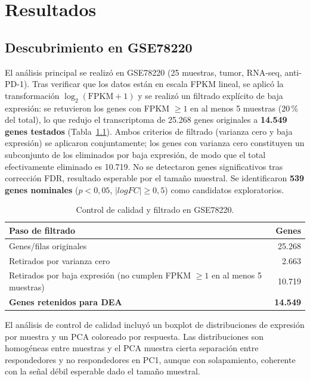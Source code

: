 \chapter{Resultados}

\section{Descubrimiento en GSE78220}

El análisis principal se realizó en GSE78220 (25 muestras, tumor, RNA-seq, anti-PD-1). Tras verificar que los datos están en escala FPKM lineal, se aplicó la transformación $\log_2(\text{FPKM}+1)$ y se realizó un filtrado explícito de baja expresión: se retuvieron los genes con FPKM $\geq 1$ en al menos 5 muestras (20\,\% del total), lo que redujo el transcriptoma de 25.268 genes originales a \textbf{14.549 genes testados} (Tabla~\ref{tab:qc_gse78220}). Ambos criterios de filtrado (varianza cero y baja expresión) se aplicaron conjuntamente; los genes con varianza cero constituyen un subconjunto de los eliminados por baja expresión, de modo que el total efectivamente eliminado es 10.719. No se detectaron genes significativos tras corrección FDR, resultado esperable por el tamaño muestral. Se identificaron \textbf{539 genes nominales} ($p < 0{,}05$, $|logFC| \geq 0{,}5$) como candidatos exploratorios.

\begin{table}[H]
\centering
\caption{Control de calidad y filtrado en GSE78220.}
\label{tab:qc_gse78220}
\begin{tabularx}{\textwidth}{l r}
\toprule
Paso de filtrado & Genes \\
\midrule
Genes/filas originales & 25.268 \\
Retirados por varianza cero & 2.663 \\
Retirados por baja expresión (no cumplen FPKM $\geq 1$ en al menos 5 muestras) & 10.719 \\
\textbf{Genes retenidos para DEA} & \textbf{14.549} \\
\bottomrule
\end{tabularx}
\end{table}

El análisis de control de calidad incluyó un boxplot de distribuciones de expresión por muestra y un PCA coloreado por respuesta. Las distribuciones son homogéneas entre muestras y el PCA muestra cierta separación entre respondedores y no respondedores en PC1, aunque con solapamiento, coherente con la señal débil esperable dado el tamaño muestral.

